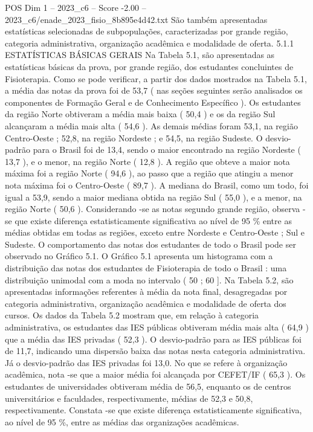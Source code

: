 \begin{textsample}{POS Dim 1 – 2023\_c6 – Score -2.00 – 2023\_c6/enade\_2023\_fisio\_8b895e4d42.txt}
São também apresentadas estatísticas selecionadas de subpopulações, caracterizadas por grande região, categoria administrativa, organização acadêmica e modalidade de oferta. 5.1.1 ESTATÍSTICAS BÁSICAS GERAIS Na Tabela 5.1, são apresentadas as estatísticas básicas da prova, por grande região, dos estudantes concluintes de Fisioterapia.
Como se pode verificar, a partir dos dados mostrados na Tabela 5.1, a média das notas da prova foi de 53,7 ( nas seções seguintes serão analisados os componentes de Formação Geral e de Conhecimento Específico ).
Os estudantes da região Norte obtiveram a média mais baixa ( 50,4 ) e os da região Sul alcançaram a média mais alta ( 54,6 ).
As demais médias foram 53,1, na região Centro-Oeste ; 52,8, na região Nordeste ; e 54,5, na região Sudeste.
O desvio-padrão para o Brasil foi de 13,4, sendo o maior encontrado na região Nordeste ( 13,7 ), e o menor, na região Norte ( 12,8 ).
A região que obteve a maior nota máxima foi a região Norte ( 94,6 ), ao passo que a região que atingiu a menor nota máxima foi o Centro-Oeste ( 89,7 ).
A mediana do Brasil, como um todo, foi igual a 53,9, sendo a maior mediana obtida na região Sul ( 55,0 ), e a menor, na região Norte ( 50,6 ).
Considerando -se as notas segundo grande região, observa -se que existe diferença estatisticamente significativa ao nível de 95 \% entre as médias obtidas em todas as regiões, exceto entre Nordeste e Centro-Oeste ; Sul e Sudeste.
O comportamento das notas dos estudantes de todo o Brasil pode ser observado no Gráfico 5.1.
O Gráfico 5.1 apresenta um histograma com a distribuição das notas dos estudantes de Fisioterapia de todo o Brasil : uma distribuição unimodal com a moda no intervalo ( 50 ; 60 ].
Na Tabela 5.2, são apresentadas informações referentes à média da nota final, desagregadas por categoria administrativa, organização acadêmica e modalidade de oferta dos cursos.
Os dados da Tabela 5.2 mostram que, em relação à categoria administrativa, os estudantes das IES públicas obtiveram média mais alta ( 64,9 ) que a média das IES privadas ( 52,3 ).
O desvio-padrão para as IES públicas foi de 11,7, indicando uma dispersão baixa das notas nesta categoria administrativa.
Já o desvio-padrão das IES privadas foi 13,0.
No que se refere à organização acadêmica, nota -se que a maior média foi alcançada por CEFET/IF ( 65,3 ).
Os estudantes de universidades obtiveram média de 56,5, enquanto os de centros universitários e faculdades, respectivamente, médias de 52,3 e 50,8, respectivamente.
Constata -se que existe diferença estatisticamente significativa, ao nível de 95 \%, entre as médias das organizações acadêmicas.

\end{textsample}
